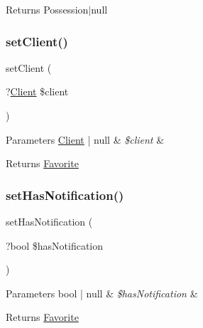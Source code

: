 \begin{DoxyReturn}{Returns}
Possession$\vert$null 
\end{DoxyReturn}
\mbox{\label{class_app_1_1_entity_1_1_favorite_a8122a5458a0e4aa14a4a16840c769a64}} 
\subsubsection{\texorpdfstring{setClient()}{setClient()}}
{\footnotesize\ttfamily set\+Client (\begin{DoxyParamCaption}\item[{?\mbox{\hyperlink{class_app_1_1_entity_1_1_client}{Client}}}]{\$client }\end{DoxyParamCaption})}


\begin{DoxyParams}[1]{Parameters}
\mbox{\hyperlink{class_app_1_1_entity_1_1_client}{Client}} | null & {\em \$client} & \\
\hline
\end{DoxyParams}
\begin{DoxyReturn}{Returns}
\mbox{\hyperlink{class_app_1_1_entity_1_1_favorite}{Favorite}} 
\end{DoxyReturn}
\mbox{\label{class_app_1_1_entity_1_1_favorite_ae73b1cb7feef9301feb1cb0b3b6e6531}} 
\subsubsection{\texorpdfstring{setHasNotification()}{setHasNotification()}}
{\footnotesize\ttfamily set\+Has\+Notification (\begin{DoxyParamCaption}\item[{?bool}]{\$has\+Notification }\end{DoxyParamCaption})}


\begin{DoxyParams}[1]{Parameters}
bool | null & {\em \$has\+Notification} & \\
\hline
\end{DoxyParams}
\begin{DoxyReturn}{Returns}
\mbox{\hyperlink{class_app_1_1_entity_1_1_favorite}{Favorite}} 
\end{DoxyReturn}
\mbox{\label{class_app_1_1_entity_1_1_favorite_ad625cd7a23ddbd219c5f6b58e85f2977}} 
